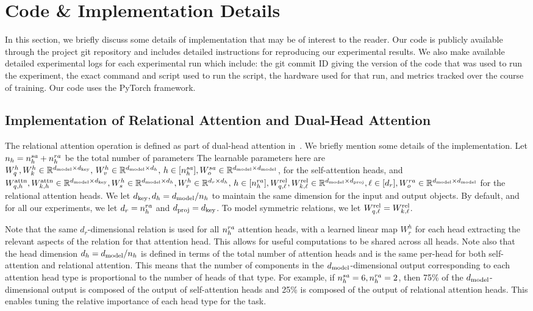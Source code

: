 
\section{Code \& Implementation Details}\label{sec:appendix_implementation}

In this section, we briefly discuss some details of implementation that may be of interest to the reader. Our code is publicly available through the project git repository and includes detailed instructions for reproducing our experimental results. We also make available detailed experimental logs for each experimental run which include: the git commit ID giving the version of the code that was used to run the experiment, the exact command and script used to run the script, the hardware used for that run, and metrics tracked over the course of training. Our code uses the PyTorch framework.

\subsection{Implementation of Relational Attention and Dual-Head Attention}

The relational attention operation is defined as part of dual-head attention in~. We briefly mention some details of the implementation. Let $n_h = n_h^{sa} + n_h^{ra}$ be the total number of parameters The learnable parameters here are $W_q^h, W_k^h \in \mathbb{R}^{d_{\mathrm{model}} \times d_{\mathrm{key}}},\, W_v^h \in \mathbb{R}^{d_{\mathrm{model}} \times d_h}, \, h \in [n_h^{sa}], W_o^{sa} \in \mathbb{R}^{d_{\mathrm{model}} \times d_{\mathrm{model}}}$, for the self-attention heads, and $W_{q, h}^{\mathrm{attn}}, W_{k, h}^{\mathrm{attn}} \in \mathbb{R}^{d_{\mathrm{model}} \times d_{\mathrm{key}}}, W_s^h \in \mathbb{R}^{d_{\mathrm{model}} \times d_h}, W_r^h \in \mathbb{R}^{d_r \times d_h},\, h \in [n_h^{ra}], W_{q, \ell}^{\mathrm{rel}}, W_{k, \ell}^{\mathrm{rel}} \in \mathbb{R}^{d_{\mathrm{model}} \times d_{\mathrm{proj}}}, \ell \in [d_r], W_o^{ra} \in \mathbb{R}^{d_{\mathrm{model}} \times d_{\mathrm{model}}}$ for the relational attention heads. We let $d_{\mathrm{key}}, d_h = d_{\mathrm{model}} / n_h$ to maintain the same dimension for the input and output objects. By default, and for all our experiments, we let $d_r = n_h^{ra}$ and $d_{\mathrm{proj}} = d_{\mathrm{key}}$. To model symmetric relations, we let $W_{q, \ell}^{\mathrm{rel}} = W_{k, \ell}^{\mathrm{rel}}$.

Note that the same $d_r$-dimensional relation is used for all $n_h^{ra}$ attention heads, with a learned linear map $W_r^h$ for each head extracting the relevant aspects of the relation for that attention head. This allows for useful computations to be shared across all heads. Note also that the head dimension $d_h = d_{\mathrm{model}} / n_h$ is defined in terms of the total number of attention heads and is the same per-head for both self-attention and relational attention. This means that the number of components in the $d_{\mathrm{model}}$-dimensional output corresponding to each attention head type is proportional to the number of heads of that type. For example, if $n_h^{sa} = 6, n_h^{ra} = 2$, then 75\% of the $d_{\mathrm{model}}$-dimensional output is composed of the output of self-attention heads and 25\% is composed of the output of relational attention heads. This enables tuning the relative importance of each head type for the task.

